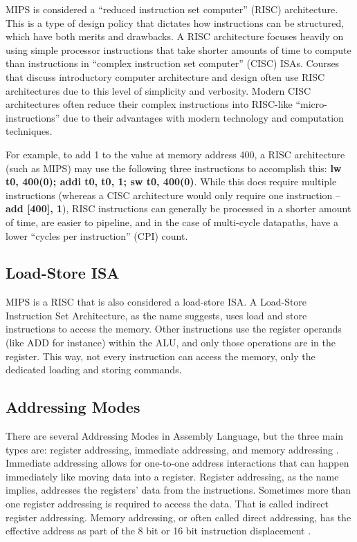 \documentclass[
    paper=letter,
    parskip=half,
    fontsize=12pt,
    titlepage=firstiscover,
    toc=bibliography,
    numbers=endperiod
]{scrartcl}
\begin{document}
MIPS is considered a ``reduced instruction set computer'' (RISC)
architecture. This is a type of design policy that dictates how
instructions can be structured, which have both merits and drawbacks. A
RISC architecture focuses heavily on using simple processor instructions
that take shorter amounts of time to compute than instructions in
``complex instruction set computer'' (CISC) ISAs. Courses that discuss
introductory computer architecture and design often use RISC
architectures due to this level of simplicity and verbosity. Modern CISC
architectures often reduce their complex instructions into RISC-like
``micro-instructions'' due to their advantages with modern technology and
computation techniques.

For example, to add 1 to the value at memory address 400, a RISC
architecture (such as MIPS) may use the following three instructions to
accomplish this: \textbf{lw t0, 400(0); addi t0, t0, 1; sw t0, 400(0)}.
While this does require multiple instructions (whereas a CISC
architecture would only require one instruction -- \textbf{add {[}400{]},
1}), RISC instructions can generally be processed in a shorter amount of
time, are easier to pipeline, and in the case of multi-cycle datapaths,
have a lower ``cycles per instruction'' (CPI) count.

\subsection{Load-Store ISA}

MIPS is a RISC that is also considered a load-store ISA. A Load-Store
Instruction Set Architecture, as the name suggests, uses load and store
instructions to access the memory. Other instructions use the register
operands (like ADD for instance) within the ALU, and only those
operations are in the register. This way, not every instruction can
access the memory, only the dedicated loading and storing commands.

\subsection{Addressing Modes}

There are several Addressing Modes in Assembly Language, but the three
main types are: register addressing, immediate addressing, and memory
addressing \cite{tutorialspoint-assembly-addressing-modes}. Immediate addressing allows for one-to-one address
interactions that can happen immediately like moving data into a
register. Register addressing, as the name implies, addresses the
registers' data from the instructions. Sometimes more than one register
addressing is required to access the data. That is called indirect
register addressing. Memory addressing, or often called direct
addressing, has the effective address as part of the 8 bit or 16 bit
instruction displacement \cite{gfg-addressing-modes}.
\end{document}
